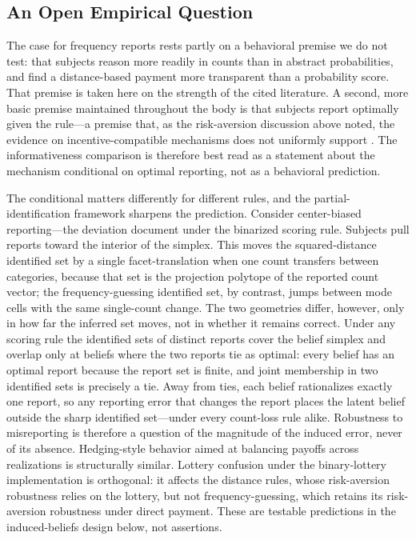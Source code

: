 \subsection{An Open Empirical Question}\label{sec:empirical}

The case for frequency reports rests partly on a behavioral premise we do not test: that subjects reason more readily in counts than in abstract probabilities, and find a distance-based payment more transparent than a probability score.
That premise is taken here on the strength of the cited literature.
A second, more basic premise maintained throughout the body is that subjects report optimally given the rule---a premise that, as the risk-aversion discussion above noted, the evidence on incentive-compatible mechanisms does not uniformly support \citep{DanzVesterlundWilson2022}.
The informativeness comparison is therefore best read as a statement about the mechanism conditional on optimal reporting, not as a behavioral prediction.

The conditional matters differently for different rules, and the partial-identification framework sharpens the prediction.
Consider center-biased reporting---the deviation \citet{DanzVesterlundWilson2022} document under the binarized scoring rule.
Subjects pull reports toward the interior of the simplex.
This moves the squared-distance identified set by a single facet-translation when one count transfers between categories, because that set is the projection polytope of the reported count vector; the frequency-guessing identified set, by contrast, jumps between mode cells with the same single-count change.
The two geometries differ, however, only in how far the inferred set moves, not in whether it remains correct.
Under any scoring rule the identified sets of distinct reports cover the belief simplex and overlap only at beliefs where the two reports tie as optimal: every belief has an optimal report because the report set is finite, and joint membership in two identified sets is precisely a tie.
Away from ties, each belief rationalizes exactly one report, so any reporting error that changes the report places the latent belief outside the sharp identified set---under every count-loss rule alike.
Robustness to misreporting is therefore a question of the magnitude of the induced error, never of its absence.
Hedging-style behavior aimed at balancing payoffs across realizations is structurally similar.
Lottery confusion under the binary-lottery implementation \citep{HossainOkui2013,Harrison2014} is orthogonal: it affects the distance rules, whose risk-aversion robustness relies on the lottery, but not frequency-guessing, which retains its risk-aversion robustness under direct payment.
These are testable predictions in the induced-beliefs design below, not assertions.

